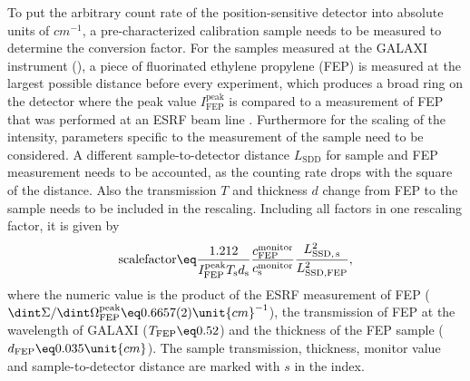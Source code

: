 \documentclass[\main/dresen_thesis.tex]{subfiles}
\begin{document}
    To put the arbitrary count rate of the position-sensitive detector into absolute units of $\unit{cm^{-1}}$, a pre-characterized calibration sample needs to be measured to determine the conversion factor.
    For the samples measured at the GALAXI instrument (), a piece of fluorinated ethylene propylene (FEP) is measured at the largest possible distance before every experiment, which produces a broad ring on the detector where the peak value $I_\mathrm{FEP}^\mathrm{peak}$ is compared to a measurement of FEP that was performed at an ESRF beam line \cite{Meyer_2009_Struk}.
    Furthermore for the scaling of the intensity, parameters specific to the measurement of the sample need to be considered.
    A different sample-to-detector distance $L_\mathrm{SDD}$ for sample and FEP measurement needs to be accounted, as the counting rate drops with the square of the distance.
    Also the transmission $T$ and thickness $d$ change from FEP to the sample needs to be included in the rescaling.
    Including all factors in one rescaling factor, it is given by
    \begin{align}
      \mathrm{scale factor} \eq \frac{1.212}{I_\mathrm{FEP}^\mathrm{peak} T_\mathrm{s} d_\mathrm{s}} \frac{c^\mathrm{monitor}_\mathrm{FEP}}{c_\mathrm{s}^\mathrm{monitor}} \frac{L^2_\mathrm{SSD,\, s}}{L^2_\mathrm{SSD, FEP}},
    \end{align}
    where the numeric value is the product of the ESRF measurement of FEP ($\dint \Sigma / \dint \Omega_\mathrm{FEP}^\mathrm{peak} \eq 0.6657(2) \unit{cm}^{-1}$), the transmission of FEP at the wavelength of GALAXI ($T_\mathrm{FEP} \eq 0.52$) and the thickness of the FEP sample ($d_\mathrm{FEP} \eq 0.035 \unit{cm}$).
    The sample transmission, thickness, monitor value and sample-to-detector distance are marked with $s$ in the index.
\end{document}
